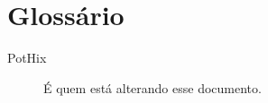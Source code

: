 \section*{Glossário}
\begin{description}
\item[PotHix ] É quem está alterando esse documento.

\end{description}

\newpage
